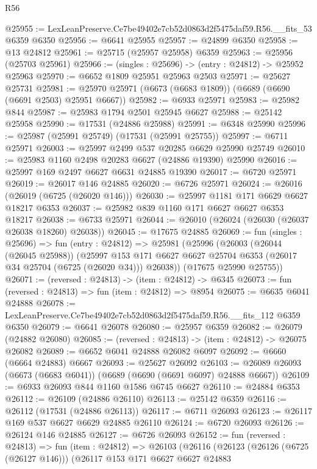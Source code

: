 \begin{lexlean}{R56}
\begin{coremodule}
@25955 := LexLeanPreserve.Ce7be49402e7cb52d0863d2f5475daf59.R56.__fits_53 @6359 @6350
@25956 := @6641 @25955
@25957 := @24899 @6350
@25958 := @13 @24812
@25961 := @25715 (@25957 @25958) @6359
@25963 := @25956 (@25703 @25961)
@25966 := (singles : @25696) -> (entry : @24812) -> @25952 @25963
@25970 := @6652 @1809 @25951 @25963 @2503
@25971 := @25627 @25731
@25981 := @25970 @25971 (@6673 (@6683 @1809)) (@6689 (@6690 (@6691 @2503) @25951 @6667))
@25982 := @6933 @25971
@25983 := @25982 @844
@25987 := @25983 @1794 @2501 @25945 @6627
@25988 := @25142 @25958
@25990 := @17531 (@24886 @25988)
@25991 := @6348 @25990
@25996 := @25987 (@25991 @25749) (@17531 (@25991 @25755))
@25997 := @6711 @25971
@26003 := @25997 @2499 @537 @20285 @6629 @25990 @25749
@26010 := @25983 @1160 @2498 @20283 @6627 (@24886 @19390) @25990
@26016 := @25997 @169 @2497 @6627 @6631 @24885 @19390
@26017 := @6720 @25971
@26019 := @26017 @146 @24885
@26020 := @6726 @25971
@26024 := @26016 (@26019 (@6725 (@26020 @146)))
@26030 := @25997 @1181 @171 @6629 @6627 @18217 @6353
@26037 := @25982 @839 @1160 @171 @6627 @6627 @6353 @18217
@26038 := @6733 @25971
@26044 := @26010 (@26024 (@26030 (@26037 @26038 @18260) @26038))
@26045 := @17675 @24885
@26069 := fun (singles : @25696) =>
  fun (entry : @24812) =>
  @25981
    (@25996
      (@26003
        (@26044 (@26045 @25988))
        (@25997 @153 @171 @6627 @6627 @25704 @6353 (@26017 @34 @25704 (@6725 (@26020 @34))) @26038))
      (@17675 @25990 @25755))
@26071 := (reversed : @24813) -> (item : @24812) -> @6345
@26073 := fun (reversed : @24813) => fun (item : @24812) => @8954
@26075 := @6635 @6041 @24888
@26078 := LexLeanPreserve.Ce7be49402e7cb52d0863d2f5475daf59.R56.__fits_112 @6359 @6350
@26079 := @6641 @26078
@26080 := @25957 @6359
@26082 := @26079 (@24882 @26080)
@26085 := (reversed : @24813) -> (item : @24812) -> @26075 @26082
@26089 := @6652 @6041 @24888 @26082 @6097
@26092 := @6660 (@6664 @24883) @6667
@26093 := @25627 @26092
@26103 := @26089 @26093 (@6673 (@6683 @6041)) (@6689 (@6690 (@6691 @6097) @24888 @6667))
@26109 := @6933 @26093 @844 @1160 @1586 @6745 @6627
@26110 := @24884 @6353
@26112 := @26109 (@24886 @26110)
@26113 := @25142 @6359
@26116 := @26112 (@17531 (@24886 @26113))
@26117 := @6711 @26093
@26123 := @26117 @169 @537 @6627 @6629 @24885 @26110
@26124 := @6720 @26093
@26126 := @26124 @146 @24885
@26127 := @6726 @26093
@26152 := fun (reversed : @24813) =>
  fun (item : @24812) =>
  @26103
    (@26116
      (@26123
        (@26126 (@6725 (@26127 @146)))
        (@26117
          @153
          @171
          @6627
          @6627
          @24883

\end{coremodule}
\end{lexlean}
